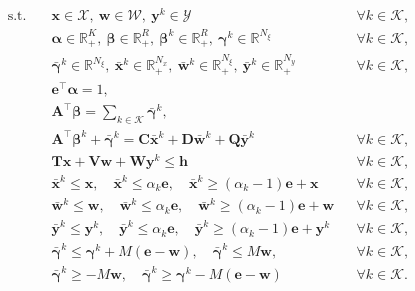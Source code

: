 \documentclass{article}
\begin{document}
\begin{equation}
\begin{aligned}
\text{s.t.}\quad
& \boldsymbol{x}\in\mathcal{X},\ \boldsymbol{w}\in\mathcal{W},\ \boldsymbol{y}^k\in\mathcal{Y}
&& \forall k\in\mathcal{K}, \\
& \boldsymbol{\alpha}\in\mathbb{R}_+^{K},\ \boldsymbol{\beta}\in\mathbb{R}_+^{R},\ \boldsymbol{\beta}^k\in\mathbb{R}_+^{R},\ \boldsymbol{\gamma}^k\in\mathbb{R}^{N_\xi}
&& \forall k\in\mathcal{K}, \\
& \bar{\boldsymbol{\gamma}}^k\in\mathbb{R}^{N_\xi},\ \bar{\boldsymbol{x}}^k\in\mathbb{R}_+^{N_x},\ \bar{\boldsymbol{w}}^k\in\mathbb{R}_+^{N_\xi},\ \bar{\boldsymbol{y}}^k\in\mathbb{R}_+^{N_y}
&& \forall k\in\mathcal{K}, \\
& \boldsymbol{e}^{\top}\boldsymbol{\alpha}=1, \\
& \boldsymbol{A}^{\top}\boldsymbol{\beta}=\sum_{k\in\mathcal{K}}\bar{\boldsymbol{\gamma}}^k, \\
& \boldsymbol{A}^{\top}\boldsymbol{\beta}^k+\bar{\boldsymbol{\gamma}}^k
= \boldsymbol{C}\bar{\boldsymbol{x}}^k+\boldsymbol{D}\bar{\boldsymbol{w}}^k+\boldsymbol{Q}\bar{\boldsymbol{y}}^k
&& \forall k\in\mathcal{K}, \\
& \boldsymbol{T}\boldsymbol{x}+\boldsymbol{V}\boldsymbol{w}+\boldsymbol{W}\boldsymbol{y}^k \le \boldsymbol{h}
&& \forall k\in\mathcal{K}, \\
& \bar{\boldsymbol{x}}^k \le \boldsymbol{x},\quad
\bar{\boldsymbol{x}}^k \le \alpha_k \boldsymbol{e},\quad
\bar{\boldsymbol{x}}^k \ge (\alpha_k-1)\boldsymbol{e}+\boldsymbol{x}
&& \forall k\in\mathcal{K}, \\
& \bar{\boldsymbol{w}}^k \le \boldsymbol{w},\quad
\bar{\boldsymbol{w}}^k \le \alpha_k \boldsymbol{e},\quad
\bar{\boldsymbol{w}}^k \ge (\alpha_k-1)\boldsymbol{e}+\boldsymbol{w}
&& \forall k\in\mathcal{K}, \\
& \bar{\boldsymbol{y}}^k \le \boldsymbol{y}^k,\quad
\bar{\boldsymbol{y}}^k \le \alpha_k \boldsymbol{e},\quad
\bar{\boldsymbol{y}}^k \ge (\alpha_k-1)\boldsymbol{e}+\boldsymbol{y}^k
&& \forall k\in\mathcal{K}, \\
& \bar{\boldsymbol{\gamma}}^k \le \boldsymbol{\gamma}^k + M(\boldsymbol{e}-\boldsymbol{w}),\quad
\bar{\boldsymbol{\gamma}}^k \le M\boldsymbol{w},
&& \forall k\in\mathcal{K}, \\
& \bar{\boldsymbol{\gamma}}^k \ge -M\boldsymbol{w},\quad
\bar{\boldsymbol{\gamma}}^k \ge \boldsymbol{\gamma}^k - M(\boldsymbol{e}-\boldsymbol{w})
&& \forall k\in\mathcal{K}.
\end{aligned}
\end{equation}
\end{document}
